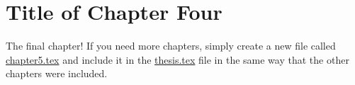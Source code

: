 \chapter{Title of Chapter Four}

The final chapter! If you need more chapters, simply create a new file called \url{chapter5.tex} and include it in the \url{thesis.tex} file in the same way that the other chapters were included.

